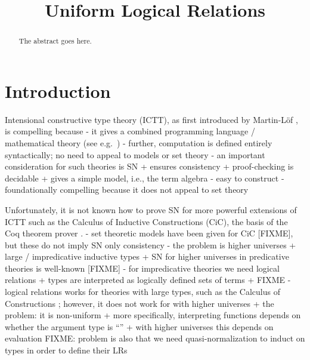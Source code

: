 \documentclass[conference]{IEEEtran}
\begin{document}




\title{Uniform Logical Relations}
\author{
}


\maketitle

\begin{abstract}
The abstract goes here.
\end{abstract}



\section{Introduction}

Intensional constructive type theory (ICTT), as first introduced by
Martin-L\"{o}f \cite{martinlof72}, is compelling because
- it gives a combined programming language / mathematical
  theory (see e.g.~\cite{nps90})
- further, computation is defined entirely syntactically; no need
  to appeal to models or set theory
- an important consideration for such theories is SN
  + ensures consistency
  + proof-checking is decidable
  + gives a simple model, i.e., the term algebra
    - easy to construct
    - foundationally compelling because it does not appeal to set theory


Unfortunately, it is not known how to prove SN for more powerful
extensions of ICTT such as the Calculus of Inductive Constructions
(CiC), the basis of the Coq theorem prover \cite{coq}.
- set theoretic models have been given for CiC [FIXME], but these do
  not imply SN only consistency
- the problem is higher universes + large / impredicative inductive types
  + SN for higher universes in predicative theories is well-known [FIXME]
- for impredicative theories we need logical relations
  \cite{girard-proofs-types}
  + types are interpreted as logically defined sets of terms
  + FIXME
- logical relations works for theories with large types, such as
  the Calculus of Constructions \cite{coquand88}; however, it does
  not work for with higher universes
  + the problem: it is non-uniform
  + more specifically, interpreting functions depends on whether the argument
    type is ``\Type''
  + with higher universes this depends on evaluation
FIXME: problem is also that we need quasi-normalization to induct on types
in order to define their LRs
\end{document}
